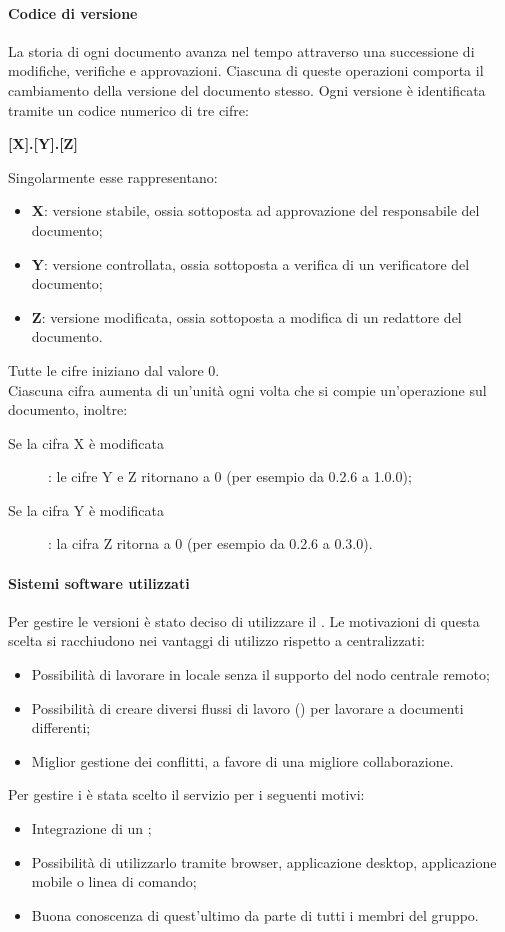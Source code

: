 \paragraph{Codice di versione}
La storia di ogni documento avanza nel tempo attraverso una successione di modifiche, verifiche e approvazioni. Ciascuna di queste operazioni comporta il cambiamento della versione del documento stesso. Ogni versione è identificata tramite un codice numerico di tre cifre:
\begin{center}
\textbf{[X].[Y].[Z]} 
\end{center}
Singolarmente esse rappresentano:
\begin{itemize}
	\item \textbf{X}: versione stabile, ossia sottoposta ad approvazione del responsabile del documento;
  	\item \textbf{Y}: versione controllata, ossia sottoposta a verifica di un verificatore del documento;
  	\item \textbf{Z}: versione modificata, ossia sottoposta a modifica di un redattore del documento.
\end{itemize}
  
Tutte le cifre iniziano dal valore 0. \\ 
Ciascuna cifra aumenta di un'unità ogni volta che si compie un'operazione sul documento, inoltre:
\begin{description}
	\item[Se la cifra X è modificata] : le cifre Y e Z ritornano a 0 (per esempio da 0.2.6 a 1.0.0);
	\item[Se la cifra Y è modificata] : la cifra Z ritorna a 0 (per esempio da 0.2.6 a 0.3.0).
\end{description}

\paragraph{Sistemi software utilizzati}
Per gestire le versioni è stato deciso di utilizzare il  . 
Le motivazioni di questa scelta si racchiudono nei vantaggi di utilizzo rispetto a  centralizzati:
\begin{itemize}
	\item Possibilità di lavorare in locale senza il supporto del nodo centrale remoto; 
	\item Possibilità di creare diversi flussi di lavoro () per lavorare a documenti differenti;
	\item Miglior gestione dei conflitti, a favore di una migliore collaborazione.
\end{itemize}
Per gestire i   è stata scelto il servizio  per i seguenti motivi: 
\begin{itemize}
	\item Integrazione di un ;
	\item Possibilità di utilizzarlo tramite browser, applicazione desktop, applicazione mobile o linea di comando;
	\item Buona conoscenza di quest'ultimo da parte di tutti i membri del gruppo.
\end{itemize}

